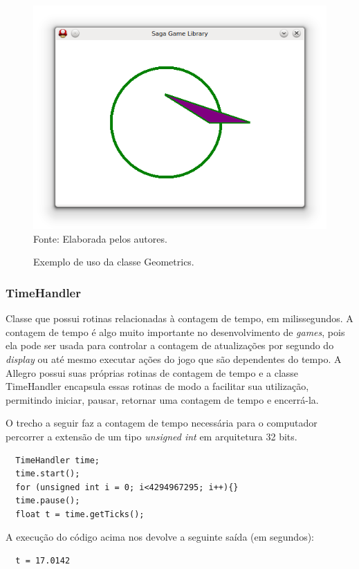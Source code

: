 \begin{figure}[H]
    \centering
    \caption{Exemplo de uso da classe Geometrics.}
    \label{ExemploGeometric}
    \includegraphics[scale = 0.7]{Imagens/ExemploGeometric.png}
    \\Fonte: Elaborada pelos autores.
\end{figure}
%
%
\subsubsection{TimeHandler}
%
%
Classe que possui rotinas relacionadas à contagem de tempo, em milissegundos. A contagem de tempo é algo muito importante no desenvolvimento de \textit{games}, pois ela pode ser usada para controlar a contagem de atualizações por segundo do \textit{display} ou até mesmo executar ações do jogo que são dependentes do tempo. A Allegro possui suas próprias rotinas de contagem de tempo e a classe TimeHandler encapsula essas rotinas de modo a facilitar sua utilização, permitindo iniciar, pausar, retornar uma
contagem de tempo e encerrá-la.
\par
O trecho a seguir faz a contagem de tempo necessária para o computador percorrer a extensão de um tipo \textit{unsigned int} em arquitetura 32 bits.
%
\begin{lstlisting}
  TimeHandler time;
  time.start();
  for (unsigned int i = 0; i<4294967295; i++){} 
  time.pause();
  float t = time.getTicks();
\end{lstlisting}
%
\par 
A execução do código acima nos devolve a seguinte saída (em segundos): 
%
\begin{lstlisting}
  t = 17.0142
\end{lstlisting}
%
